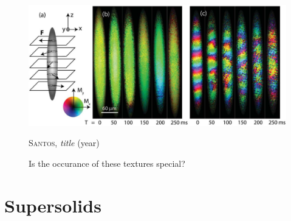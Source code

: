 \begin{figure}[H]
    \centering
    \includegraphics[width=1.0\textwidth]{IMAGE/helical.png}\\
    \caption{Is the occurance of these textures special?}
    \textsc{Santos}, \emph{title} (year)
    \label{fig:helical}
\end{figure}

\section{Supersolids}

